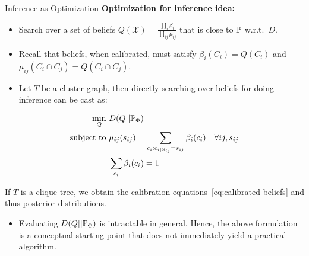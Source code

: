 \begin{frame}{Inference as Optimization}
    \textbf{Optimization for inference idea:}
    \begin{itemize}
        \item Search over a set of beliefs $Q(\mathcal{X}) = \frac{\prod_i \beta_i}{\prod_{ij} \mu_{ij}}$ that is close to $\Pb$ w.r.t.\ $D$.
        \pause \item Recall that beliefs, when calibrated, must satisfy $\beta_i(C_i) = Q(C_i)$ and $\mu_{ij}(C_i \cap C_j) = Q(C_i \cap C_j)$.
        \pause\item Let $T$ be a cluster graph, then directly searching over beliefs for doing inference can be cast as:
    \end{itemize}
    \pause
    \begin{equation}
    \begin{aligned}
            \min_Q\  & D(Q || \Pb_{\Phi}) \\
            \text{subject to } & \mu_{ij}(s_{ij}) = \sum_{c_i: c_{i|S_{ij}} = s_{ij}} \beta_i(c_i) \quad \forall ij, s_{ij} \\
            & \sum_{c_i} \beta_i(c_i) = 1
    \end{aligned}
    \end{equation}
    \pause
    \begin{corollary}
        If $T$ is a clique tree, we obtain the calibration equations~\eqref{eq:calibrated-beliefs} and thus posterior distributions.
    \end{corollary}
    \pause
    \begin{itemize}
    \item Evaluating $D(Q || \Pb_{\Phi})$ is intractable in general. Hence, the above formulation is a conceptual starting point that does not immediately yield a practical algorithm.
    \end{itemize}
\end{frame}

